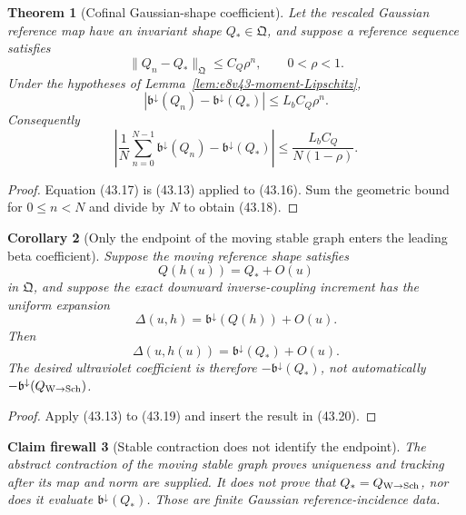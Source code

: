 \documentclass[11pt,oneside]{book}
\newtheorem{theorem}{Theorem}[chapter]
\newtheorem{corollary}[theorem]{Corollary}
\newtheorem{firewall}[theorem]{Claim firewall}
\theoremstyle{definition}
\theoremstyle{remark}
\begin{document}
\begin{theorem}[Cofinal Gaussian-shape coefficient]
\label{thm:e8v43-shape-limit}
Let the rescaled Gaussian reference map have an invariant shape
\(Q_*\in\mathfrak Q\), and suppose a reference sequence satisfies
\[
 \|Q_n-Q_*\|_{\mathfrak Q}\le C_Q\rho^n,\qquad 0<\rho<1.        \tag{43.16}
\]
Under the hypotheses of
Lemma~\ref{lem:e8v43-moment-Lipschitz},
\[
 \boxed{
 |\mathfrak b^\downarrow(Q_n)-\mathfrak b^\downarrow(Q_*)|
 \le L_bC_Q\rho^n.}                                            \tag{43.17}
\]
Consequently
\[
 \left|
 \frac1N\sum_{n=0}^{N-1}\mathfrak b^\downarrow(Q_n)
 -\mathfrak b^\downarrow(Q_*)\right|
 \le\frac{L_bC_Q}{N(1-\rho)}.                                  \tag{43.18}
\]
\end{theorem}

\begin{proof}
Equation (43.17) is (43.13) applied to (43.16).  Sum the geometric
bound for \(0\le n<N\) and divide by \(N\) to obtain (43.18).
\end{proof}

\begin{corollary}[Only the endpoint of the moving stable graph enters
the leading beta coefficient]
\label{cor:e8v43-moving-leading}
Suppose the moving reference shape satisfies
\[
 Q(h(u))=Q_*+O(u)                                               \tag{43.19}
\]
in \(\mathfrak Q\), and suppose the exact downward inverse-coupling
increment has the uniform expansion
\[
 \Delta(u,h)=\mathfrak b^\downarrow(Q(h))+O(u).                 \tag{43.20}
\]
Then
\[
 \boxed{\Delta(u,h(u))
 =\mathfrak b^\downarrow(Q_*)+O(u).}                            \tag{43.21}
\]
The desired ultraviolet coefficient is therefore
\(-\mathfrak b^\downarrow(Q_*)\), not automatically
\(-\mathfrak b^\downarrow(Q_{\rm W\to Sch})\).
\end{corollary}

\begin{proof}
Apply (43.13) to (43.19) and insert the result in (43.20).
\end{proof}

\begin{firewall}[Stable contraction does not identify the endpoint]
\label{fire:e8v43-contraction-not-incidence}
The abstract contraction of the moving stable graph proves uniqueness
and tracking after its map and norm are supplied.  It does not prove
that \(Q_*=Q_{\rm W\to Sch}\), nor does it evaluate
\(\mathfrak b^\downarrow(Q_*)\).  Those are finite Gaussian
reference-incidence data.
\end{firewall}
\end{document}
